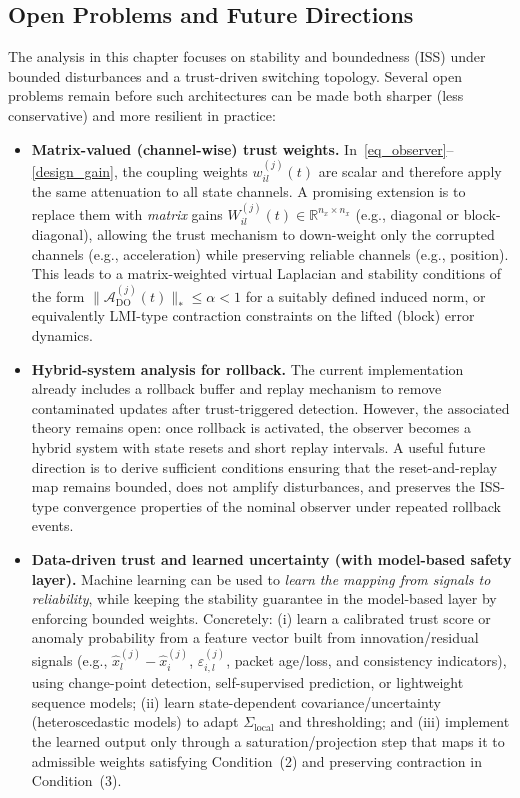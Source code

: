 \subsection{Open Problems and Future Directions}
\vspace*{-0.2cm}
The analysis in this chapter focuses on stability and boundedness (ISS) under bounded disturbances and a trust-driven switching topology. Several open problems remain before such architectures can be made both sharper (less conservative) and more resilient in practice:
\begin{itemize}
    \item \textbf{Matrix-valued (channel-wise) trust weights.}
    In~\eqref{eq_observer}--\eqref{design_gain}, the coupling weights $w_{il}^{(j)}(t)$ are scalar and therefore apply the same attenuation to all state channels. A promising extension is to replace them with \emph{matrix} gains $W_{il}^{(j)}(t)\in\mathbb{R}^{n_x\times n_x}$ (e.g., diagonal or block-diagonal), allowing the trust mechanism to down-weight only the corrupted channels (e.g., acceleration) while preserving reliable channels (e.g., position). This leads to a matrix-weighted virtual Laplacian and stability conditions of the form
    $\|\mathcal{A}_{\mathrm{DO}}^{(j)}(t)\|_*\le \alpha<1$ for a suitably defined induced norm, or equivalently LMI-type contraction constraints on the lifted (block) error dynamics.

    \item \textbf{Hybrid-system analysis for rollback.}
    The current implementation already includes a rollback buffer and replay mechanism to remove contaminated updates after trust-triggered detection. However, the associated theory remains open: once rollback is activated, the observer becomes a hybrid system with state resets and short replay intervals. A useful future direction is to derive sufficient conditions ensuring that the reset-and-replay map remains bounded, does not amplify disturbances, and preserves the ISS-type convergence properties of the nominal observer under repeated rollback events.

    \item \textbf{Data-driven trust and learned uncertainty (with model-based safety layer).}
    Machine learning can be used to \emph{learn the mapping from signals to reliability}, while keeping the stability guarantee in the model-based layer by enforcing bounded weights. Concretely: (i) learn a calibrated trust score or anomaly probability from a feature vector built from innovation/residual signals (e.g., $\hat{x}_l^{(j)}-\hat{x}_i^{(j)}$, $\varepsilon_{i,l}^{(j)}$, packet age/loss, and consistency indicators), using change-point detection, self-supervised prediction, or lightweight sequence models; (ii) learn state-dependent covariance/uncertainty (heteroscedastic models) to adapt $\Sigma_{\text{local}}$ and thresholding; and (iii) implement the learned output only through a saturation/projection step that maps it to admissible weights satisfying Condition~(2) and preserving contraction in Condition~(3).
\end{itemize}

